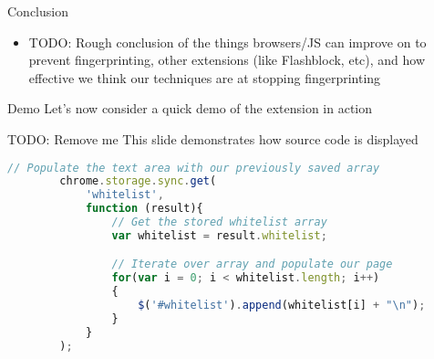 \begin{frame}[fragile,t]{Conclusion}
	\begin{itemize}
		\item TODO: Rough conclusion of the things browsers/JS can improve on to prevent fingerprinting, other extensions (like Flashblock, etc), and how effective we think our techniques are at stopping fingerprinting
	\end{itemize}
\end{frame}

\begin{frame}[plain]
	\begin{block}{Demo}
		Let's now consider a quick demo of the extension in action
	\end{block}
\end{frame}
\addtocounter{framenumber}{-1}

\begin{frame}[fragile,t]{TODO: Remove me}
	This slide demonstrates how source code is displayed
	\begin{lstlisting}[language=JavaScript]
		// Populate the text area with our previously saved array
		chrome.storage.sync.get(
		    'whitelist',
		    function (result){
		        // Get the stored whitelist array
		        var whitelist = result.whitelist;

		        // Iterate over array and populate our page
		        for(var i = 0; i < whitelist.length; i++)
		        {
		            $('#whitelist').append(whitelist[i] + "\n");
		        }
		    }
		);
	\end{lstlisting}
\end{frame}


